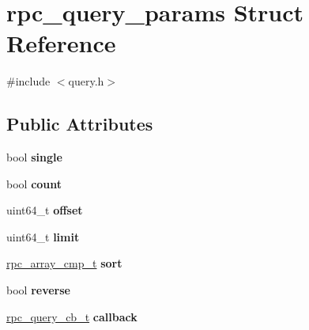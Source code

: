\hypertarget{structrpc__query__params}{}\section{rpc\+\_\+query\+\_\+params Struct Reference}
\label{structrpc__query__params}


{\ttfamily \#include $<$query.\+h$>$}

\subsection*{Public Attributes}
\begin{DoxyCompactItemize}
\item 
bool {\bfseries single}\hypertarget{structrpc__query__params_a6e4eafac062b7f7490a4983d56296385}{}\label{structrpc__query__params_a6e4eafac062b7f7490a4983d56296385}

\item 
bool {\bfseries count}\hypertarget{structrpc__query__params_a7b488114aeb262c508dd28acc1a7fc95}{}\label{structrpc__query__params_a7b488114aeb262c508dd28acc1a7fc95}

\item 
uint64\+\_\+t {\bfseries offset}\hypertarget{structrpc__query__params_a4e33edf4295472adcc84d6d1ccee2ddd}{}\label{structrpc__query__params_a4e33edf4295472adcc84d6d1ccee2ddd}

\item 
uint64\+\_\+t {\bfseries limit}\hypertarget{structrpc__query__params_a89ee7bc896675c8c2ef148436430ba0a}{}\label{structrpc__query__params_a89ee7bc896675c8c2ef148436430ba0a}

\item 
\hyperlink{object_8h_a29f4de14614637dc5848764170dcd186}{rpc\+\_\+array\+\_\+cmp\+\_\+t} {\bfseries sort}\hypertarget{structrpc__query__params_a661d864b8637b469fd99f3b7392aa507}{}\label{structrpc__query__params_a661d864b8637b469fd99f3b7392aa507}

\item 
bool {\bfseries reverse}\hypertarget{structrpc__query__params_ad50d1e6e25322f5562ec1793647c1618}{}\label{structrpc__query__params_ad50d1e6e25322f5562ec1793647c1618}

\item 
\hyperlink{query_8h_a3dd3753b86199ebdc48d1cb3ab4cf985}{rpc\+\_\+query\+\_\+cb\+\_\+t} {\bfseries callback}\hypertarget{structrpc__query__params_ab8b50541840d07c084797048d22d589a}{}\label{structrpc__query__params_ab8b50541840d07c084797048d22d589a}

\end{DoxyCompactItemize}


